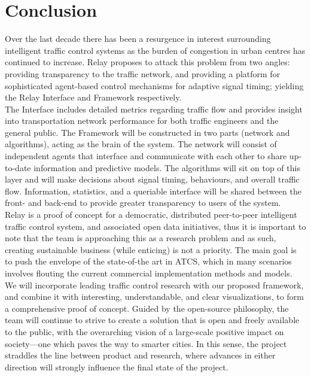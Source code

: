 \documentclass{article}
\begin{document}
\newpage
\section{Conclusion}

Over the last decade there has been a resurgence in interest surrounding intelligent traffic control systems as the burden of congestion in urban centres has continued to increase.
Relay proposes to attack this problem from two angles: providing transparency to the traffic network, and providing a platform for sophisticated agent-based control mechanisms for adaptive signal timing; yielding the Relay Interface and Framework respectively.\\
 
The Interface includes detailed metrics regarding traffic flow and provides insight into transportation network performance for both traffic engineers and the general public.
The Framework will be constructed in two parts (network and algorithms), acting as the brain of the system. 
The network will consist of independent agents that interface and communicate with each other to share up-to-date information and predictive models.
The algorithms will sit on top of this layer and will make decisions about signal timing, behaviours, and overall traffic flow. 
Information, statistics, and a queriable interface will be shared between the front- and back-end to provide greater transparency to users of the system.\\

Relay is a proof of concept for a democratic, distributed peer-to-peer intelligent traffic control system, and associated open data initiatives, thus it is important to note that the team is approaching this as a research problem and as such, creating sustainable business (while enticing) is not a priority.
The main goal is to push the envelope of the state-of-the art in ATCS, which in many scenarios involves flouting the current commercial implementation methods and models.
 We will incorporate leading traffic control research with our proposed framework, and combine it with interesting, understandable, and clear visualizations, to form a comprehensive proof of concept.
 Guided by the open-source philosophy, the team will continue to strive to create a solution that is open and freely available to the public, with the overarching vision of a large-scale positive impact on society---one which paves the way to smarter cities.
 In this sense, the project straddles the line between product and research, where advances in either direction will strongly influence the final state of the project.\\
\end{document}
